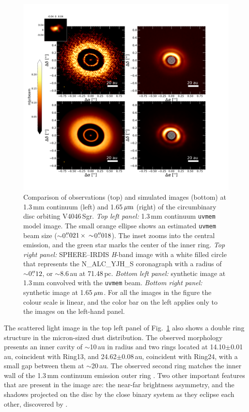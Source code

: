 \documentclass[fleqn,usenatbib,useAMS]{mnras}
\begin{document}
\begin{figure}
  \includegraphics[width=\textwidth]{hot_two_E.pdf}
  \caption{Comparison of observations (top) and simulated images (bottom) at 1.3\,mm continuum (left) and 1.65\,$\hbox{$\mu$m}$ (right) of the circumbinary disc orbiting V4046\,Sgr. \textit{Top left panel:} 1.3\,mm continuum {\tt uvmem} model image. The small orange ellipse shows an estimated {\tt uvmem} beam size ($\sim$0$\hbox{$.\!\!^{\prime\prime}$}021 \, \times \, \sim$0$\hbox{$.\!\!^{\prime\prime}$}018$). The inset zooms into the central emission, and the green star marks the center of the inner ring. \textit{Top right panel:} SPHERE--IRDIS \textit{H}-band image with a white filled circle that represents the N\_ALC\_YJH\_S coronagraph with a radius of $\sim$0$\hbox{$.\!\!^{\prime\prime}$}12$, or $\sim$8.6\,au at 71.48\,pc.  \textit{Bottom left panel:} synthetic image at 1.3\,mm convolved with the {\tt uvmem} beam. \textit{Bottom right panel:} synthetic image at 1.65\,$\hbox{$\mu$m}$. For all the images in the figure the colour scale is linear, and the color bar on the left applies only to the images on the left-hand panel.}
  \label{fig:images_vs_simulated}
\end{figure}

The scattered light image in the top left panel of Fig.~\ref{fig:images_vs_simulated} also shows a double ring structure in the micron-sized dust distribution. The observed morphology presents an inner cavity of $\sim$10\,au in radius and two rings located at 14.10$\pm$0.01\,au, coincident with Ring13, and 24.62$\pm$0.08\,au, coincident with Ring24, with a small gap between them at $\sim$20\,au. The observed second ring matches the inner wall of the 1.3\,mm continuum emission outer ring \citep{Ru_z_Rodr_guez_2019}. Two other important features that are present in the image are: the near-far brightness asymmetry, and the shadows projected on the disc by the close binary system as they eclipse each other, discovered by \citet{dOrazi}.
\end{document}
